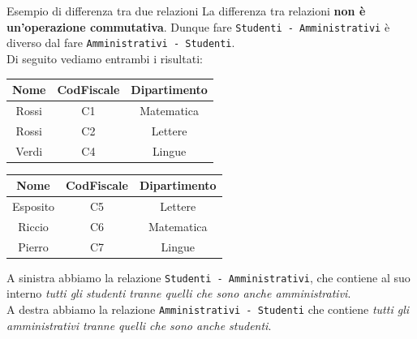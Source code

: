 \documentclass[12pt]{report}
\begin{document}
\begin{esempio}{Esempio di differenza tra due relazioni}{}
		\vspace{1em}
		La differenza tra relazioni \textbf{non è un'operazione commutativa}. Dunque fare \texttt{Studenti - Amministrativi} è diverso dal fare \texttt{Amministrativi - Studenti}.\\
		Di seguito vediamo entrambi i risultati:\\
		\begin{minipage}[t]{0.48\textwidth}
			\vspace{0.1em}
			\centering
			\renewcommand{\arraystretch}{1.3}
			\begin{tabular}{|c|c|c|}
				\hline
				\rowcolor{BrickRed!60!white}
				Nome & CodFiscale & Dipartimento \\
				\hline
				Rossi & C1 & Matematica \\
				Rossi & C2 & Lettere    \\
				Verdi & C4 & Lingue     \\
				\hline
			\end{tabular}
		\end{minipage}\hfill
		\begin{minipage}[t]{0.48\textwidth}
			\vspace{0.1em}
			\centering
			\renewcommand{\arraystretch}{1.3}
			\begin{tabular}{|c|c|c|}
				\hline
				\rowcolor{BrickRed!60!white}
				Nome & CodFiscale & Dipartimento \\
				\hline
				Esposito & C5 & Lettere    \\
				Riccio   & C6 & Matematica \\
				Pierro   & C7 & Lingue     \\
				\hline
			\end{tabular}
		\end{minipage}
		
		\vspace{1em}
		A sinistra abbiamo la relazione \texttt{Studenti - Amministrativi}, che contiene al suo interno \textit{tutti gli studenti tranne quelli che sono anche amministrativi}.\\
		A destra abbiamo la relazione \texttt{Amministrativi - Studenti} che contiene \textit{tutti gli amministrativi tranne quelli che sono anche studenti}.
	\end{esempio}
	
\end{document}
